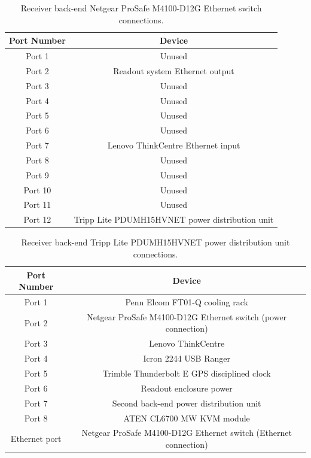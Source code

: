 \begin{table}
    \begin{center}
    \begin{tabular}{ |c|c| }
    \hline
    Port Number & Device \\
    \hline
    Port 1 & Unused \\
    Port 2 & Readout system Ethernet output \\
    Port 3 & Unused \\
    Port 4 & Unused \\
    Port 5 & Unused \\
    Port 6 & Unused \\
    Port 7 & Lenovo ThinkCentre Ethernet input \\
    Port 8 & Unused \\
    Port 9 & Unused \\
    Port 10 & Unused \\
    Port 11 & Unused \\
    Port 12 & Tripp Lite PDUMH15HVNET power distribution unit \\
    \hline
    \end{tabular}
    \caption{Receiver back-end Netgear ProSafe M4100-D12G Ethernet switch connections.}
    \label{tab:eth_switch}
    \end{center}
\end{table}

\begin{table}
    \begin{center}
    \begin{tabular}{ |c|c| }
    \hline
    Port Number & Device \\
    \hline
    Port 1 & Penn Elcom FT01-Q cooling rack\\
    Port 2 & Netgear ProSafe M4100-D12G Ethernet switch (power connection) \\
    Port 3 & Lenovo ThinkCentre \\
    Port 4 & Icron 2244 USB Ranger \\
    Port 5 & Trimble Thunderbolt E GPS disciplined clock\\
    Port 6 & Readout enclosure power \\
    Port 7 & Second back-end power distribution unit \\
    Port 8 & ATEN CL6700 MW KVM module \\
    Ethernet port & Netgear ProSafe M4100-D12G Ethernet switch (Ethernet connection) \\
    \hline
    \end{tabular}
    \caption{Receiver back-end Tripp Lite PDUMH15HVNET power distribution unit connections.}
    \label{tab:backend_pdu}
    \end{center}
\end{table}

